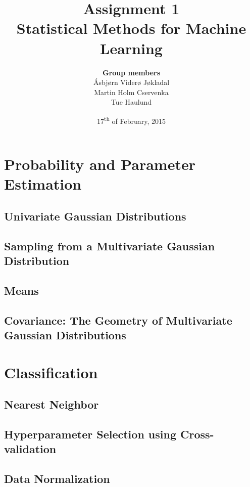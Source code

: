 \documentclass[a4paper]{article}
\title{\textbf{Assignment 1} \\ \small Statistical Methods for Machine Learning }
\author{\textbf{Group members}\\
        Ásbjørn Viderø Jøkladal\\
        Martin Holm Cservenka\\
        Tue Haulund}
\date{17\textsuperscript{th} of February, 2015}
\begin{document}
\maketitle
\tableofcontents
\newpage

\section{Probability and Parameter Estimation}

\subsection{Univariate Gaussian Distributions}

\subsection{Sampling from a Multivariate Gaussian Distribution}

\subsection{Means}

\subsection{Covariance: The Geometry of Multivariate Gaussian
Distributions}

\section{Classification}

\subsection{Nearest Neighbor}

\subsection{Hyperparameter Selection using Cross-validation}

\subsection{Data Normalization}
\end{document}
